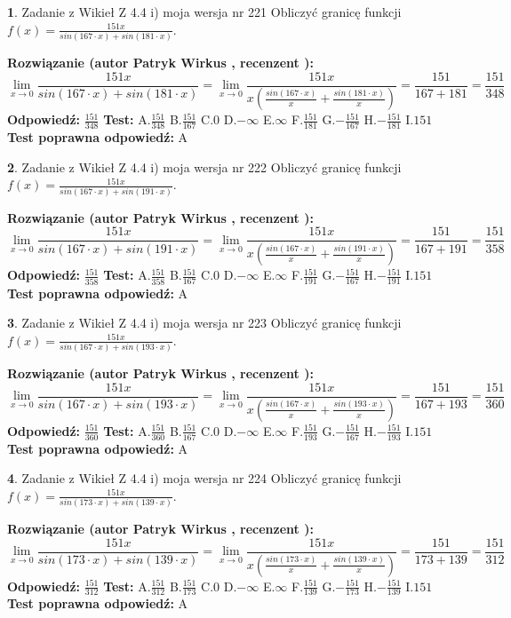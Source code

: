 \documentclass[12pt, a4paper]{article}
\theoremstyle{definition} %
\newtheorem{zad}{}
\newcommand{\zadStart}[1]{\begin{zad}#1\newline}
\newcommand{\zadStop}{\end{zad}}
\newcommand{\rozwStart}[2]{\noindent \textbf{Rozwiązanie (autor #1 , recenzent #2): }\newline}
\newcommand{\rozwStop}{\newline}
\newcommand{\odpStart}{\noindent \textbf{Odpowiedź:}\newline}
\newcommand{\odpStop}{\newline}
\newcommand{\testStart}{\noindent \textbf{Test:}\newline}
\newcommand{\testStop}{\newline}
\newcommand{\kluczStart}{\noindent \textbf{Test poprawna odpowiedź:}\newline}
\newcommand{\kluczStop}{\newline}
\begin{document}
\zadStart{Zadanie z Wikieł Z 4.4 i) moja wersja nr 221}
Obliczyć granicę funkcji $f(x)=\frac{151x}{sin(167\cdot x) +sin(181\cdot x)}$.
\zadStop
\rozwStart{Patryk Wirkus}{}
$$\lim\limits_{x\to 0}\frac{151x}{sin(167\cdot x) +sin(181\cdot x)}=\lim\limits_{x\to 0}\frac{151x}{x(\frac{sin(167\cdot x)}{x}+\frac{sin(181\cdot x)}{x})}=\frac{151}{167+181} = \frac{151}{348}$$
\rozwStop
\odpStart
$\frac{151}{348}$
\odpStop
\testStart
A.$\frac{151}{348}$
B.$\frac{151}{167}$
C.$0$
D.$-\infty$
E.$\infty$
F.$\frac{151}{181}$
G.$-\frac{151}{167}$
H.$-\frac{151}{181}$
I.$151$
\testStop
\kluczStart
A
\kluczStop



\zadStart{Zadanie z Wikieł Z 4.4 i) moja wersja nr 222}
Obliczyć granicę funkcji $f(x)=\frac{151x}{sin(167\cdot x) +sin(191\cdot x)}$.
\zadStop
\rozwStart{Patryk Wirkus}{}
$$\lim\limits_{x\to 0}\frac{151x}{sin(167\cdot x) +sin(191\cdot x)}=\lim\limits_{x\to 0}\frac{151x}{x(\frac{sin(167\cdot x)}{x}+\frac{sin(191\cdot x)}{x})}=\frac{151}{167+191} = \frac{151}{358}$$
\rozwStop
\odpStart
$\frac{151}{358}$
\odpStop
\testStart
A.$\frac{151}{358}$
B.$\frac{151}{167}$
C.$0$
D.$-\infty$
E.$\infty$
F.$\frac{151}{191}$
G.$-\frac{151}{167}$
H.$-\frac{151}{191}$
I.$151$
\testStop
\kluczStart
A
\kluczStop



\zadStart{Zadanie z Wikieł Z 4.4 i) moja wersja nr 223}
Obliczyć granicę funkcji $f(x)=\frac{151x}{sin(167\cdot x) +sin(193\cdot x)}$.
\zadStop
\rozwStart{Patryk Wirkus}{}
$$\lim\limits_{x\to 0}\frac{151x}{sin(167\cdot x) +sin(193\cdot x)}=\lim\limits_{x\to 0}\frac{151x}{x(\frac{sin(167\cdot x)}{x}+\frac{sin(193\cdot x)}{x})}=\frac{151}{167+193} = \frac{151}{360}$$
\rozwStop
\odpStart
$\frac{151}{360}$
\odpStop
\testStart
A.$\frac{151}{360}$
B.$\frac{151}{167}$
C.$0$
D.$-\infty$
E.$\infty$
F.$\frac{151}{193}$
G.$-\frac{151}{167}$
H.$-\frac{151}{193}$
I.$151$
\testStop
\kluczStart
A
\kluczStop



\zadStart{Zadanie z Wikieł Z 4.4 i) moja wersja nr 224}
Obliczyć granicę funkcji $f(x)=\frac{151x}{sin(173\cdot x) +sin(139\cdot x)}$.
\zadStop
\rozwStart{Patryk Wirkus}{}
$$\lim\limits_{x\to 0}\frac{151x}{sin(173\cdot x) +sin(139\cdot x)}=\lim\limits_{x\to 0}\frac{151x}{x(\frac{sin(173\cdot x)}{x}+\frac{sin(139\cdot x)}{x})}=\frac{151}{173+139} = \frac{151}{312}$$
\rozwStop
\odpStart
$\frac{151}{312}$
\odpStop
\testStart
A.$\frac{151}{312}$
B.$\frac{151}{173}$
C.$0$
D.$-\infty$
E.$\infty$
F.$\frac{151}{139}$
G.$-\frac{151}{173}$
H.$-\frac{151}{139}$
I.$151$
\testStop
\kluczStart
A
\kluczStop
\end{document}
